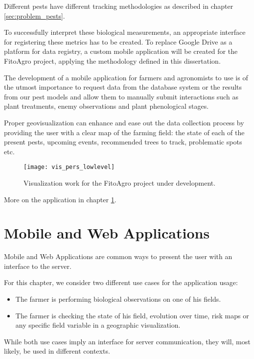  Different pests have different tracking methodologies as described in chapter \ref{sec:problem_pests}. 

To successfully interpret these biological measurements, an appropriate interface for registering these metrics has to be created. To replace Google Drive as a platform for data registry, a custom mobile application will be created for the FitoAgro project, applying the methodology defined in this dissertation. 

The development of a mobile application for farmers and agronomists to use is of the utmost importance to request data from the database system or the results from our pest models and allow them to manually submit interactions such as plant treatments, enemy observations and plant phenological stages.

Proper geovisualization can enhance and ease out the data collection process by providing the user with a clear map of the farming field: the state of each of the present pests, upcoming events, recommended trees to track, problematic spots etc.

\begin{figure}[htbp]
  \centering
  \texttt{[image: vis\_pers\_lowlevel]}
  \caption{Visualization work for the FitoAgro project under development.}
  \label{fig:vis_pers_lowlevel}
\end{figure}

More on the application in chapter \ref{sec:mobile_web_app}.

\section{Mobile and Web Applications} %
\label{sec:mobile_web_app}

Mobile and Web Applications are common ways to present the user with an interface to the server.

For this chapter, we consider two different use cases for the application usage:

\begin{itemize}
	\item The farmer is performing biological observations on one of his fields.
	\item The farmer is checking the state of his field, evolution  over time, risk maps or any specific field variable in a geographic visualization.
\end{itemize}

While both use cases imply an interface for server communication, they will, most likely, be used in different contexts.

